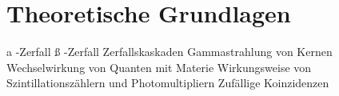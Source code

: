 \section{Theoretische Grundlagen}
a -Zerfall
ß -Zerfall
Zerfallskaskaden
Gammastrahlung von Kernen
Wechselwirkung von Quanten mit Materie
Wirkungsweise von Szintillationszählern und Photomultipliern
Zufällige Koinzidenzen
